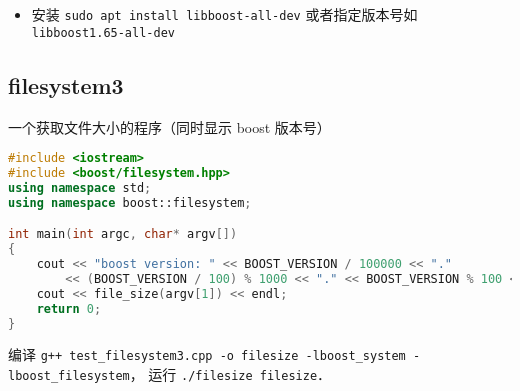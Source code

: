 
\begin{itemize}
\item 安装 \verb|sudo apt install libboost-all-dev| 或者指定版本号如 \verb|libboost1.65-all-dev|
\end{itemize}

\subsection{filesystem3}
一个获取文件大小的程序（同时显示 boost 版本号）
\begin{lstlisting}[language=cpp]
#include <iostream>
#include <boost/filesystem.hpp>
using namespace std;
using namespace boost::filesystem;

int main(int argc, char* argv[])
{
	cout << "boost version: " << BOOST_VERSION / 100000 << "."
        << (BOOST_VERSION / 100) % 1000 << "." << BOOST_VERSION % 100 << endl;
	cout << file_size(argv[1]) << endl;
	return 0;
}
\end{lstlisting}

编译 \verb|g++ test_filesystem3.cpp -o filesize -lboost_system -lboost_filesystem|， 运行 \verb|./filesize filesize|．
